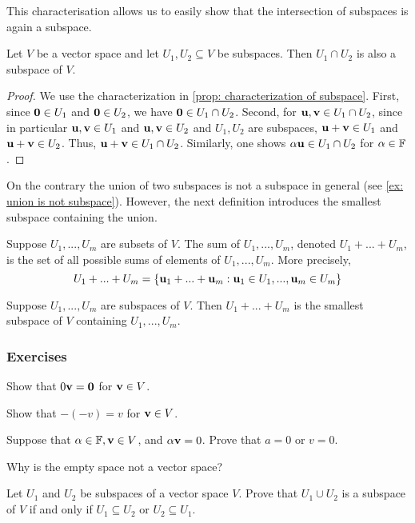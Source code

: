 \documentclass{article}
\begin{document}
This characterisation allows us to easily show that the intersection of subspaces is again a subspace.

\begin{proposition}
 Let $V$ be a vector space and let $U_1, U_2 \subseteq V$ be subspaces. Then $U_1 \cap U_2$ is also a subspace of $V$. 
\end{proposition}

\begin{proof}
We use the characterization in \cref{prop: characterization of subspace}. First, since ${\mathbf{0}} \in U_1$ and ${\mathbf{0}}\in U_2$, we have ${\mathbf{0}}\in U_1 \cap U_2$. Second, for ${\mathbf{u}}, {\mathbf{v}} \in U_1\cap U_2$, since in particular ${\mathbf{u}},{\mathbf{v}} \in U_1$ and ${\mathbf{u}},{\mathbf{v}} \in U_2$ and $U_1, U_2$ are subspaces, ${\mathbf{u}}+{\mathbf{v}}\in U_1$ and ${\mathbf{u}}+{\mathbf{v}}\in U_2$. Thus, ${\mathbf{u}}+{\mathbf{v}} \in U_1 \cap U_2$. Similarly, one shows $\alpha {\mathbf{u}} \in U_1\cap U_2$ for $\alpha \in {\mathbb{F}}$.
\end{proof}

On the contrary the union of two subspaces is not a subspace in general (see \cref{ex: union is not subspace}). However, the next definition introduces the smallest subspace containing the union.

\begin{definition}
Suppose $U_{1},...,U_{m}$ are subsets of $V$. The sum
of $U_{1},...,U_{m}$, denoted $U_{1}+...+U_{m}$, is the set of all
possible sums of elements of $U_{1},...,U_{m}.$ More precisely,
\[
U_{1}+...+U_{m}=\{{\mathbf{u}}_{1}+...+{\mathbf{u}}_{m}:{\mathbf{u}}_{1}\in U_{1},...,{\mathbf{u}}_{m}\in U_{m}\}
\]
\end{definition}


\begin{proposition}
Suppose $U_{1},...,U_{m}$ are subspaces of $V$. Then
$U_{1}+...+U_{m}$ is the smallest subspace of $V$ containing $U_{1},...,U_{m}$.
\end{proposition}



\subsubsection{Exercises}
\begin{exercise}
\label{ex:zero}
Show that $0 {\mathbf{v}}= {\mathbf{0}}$ for ${\mathbf{v}}\in V$.
\end{exercise}
\begin{exercise}
Show that $-(-v)=v$ for ${\mathbf{v}}\in V$.
\end{exercise}
\begin{exercise}
Suppose that $\alpha\in{\mathbb{F}}, {\mathbf{v}}\in V$, and $\alpha {\mathbf{v}}=0$. Prove that $a=0$
or $v=0$.
\end{exercise}
\begin{exercise}
Why is the empty space not a vector space?
\end{exercise}
\begin{exercise}\label{ex: union is not subspace}
Let $U_1$ and $U_2$ be subspaces of a vector space $V$. Prove that $U_1 \cup U_2$ is a subspace of $V$ if and only if $U_1 \subseteq U_2$ or $U_2 \subseteq U_1$.
\end{exercise}
\end{document}
